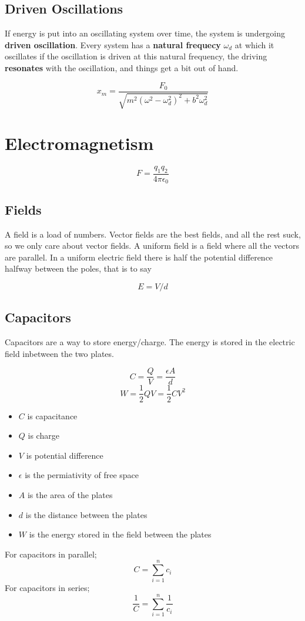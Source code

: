 \documentclass{article}
\begin{document}
\subsection{Driven Oscillations}
If energy is put into an oscillating system over time, the system is undergoing \textbf{driven oscillation}. Every system has a \textbf{natural frequecy} $\omega_d$ at which it oscillates if the oscillation is driven at this natural frequency, the driving \textbf{resonates} with the oscillation, and things get a bit out of hand.

\[x_m=\frac{F_0}{\sqrt{m^2\left(\omega^2-\omega_d^2\right)^2+b^2\omega_d^2}}\]

\section{Electromagnetism}

\[F=\frac{q_1q_2}{4\pi\epsilon_0}\]

\subsection{Fields}

A field is a load of numbers. Vector fields are the best fields, and all the rest suck, so we only care about vector fields. A uniform field is a field where all the vectors are parallel. In a uniform electric field there is half the potential difference halfway between the poles, that is to say

\[E=V/d\]

\subsection{Capacitors}


Capacitors are a way to store energy/charge. The energy is stored in the electric field inbetween the two plates.

\[C=\frac{Q}{V}=\frac{\epsilon A}{d}\]
\[W=\frac{1}{2}QV=\frac{1}{2}CV^2\]

\begin{itemize}
	\item $C$ is capacitance
	\item $Q$ is charge
	\item $V$ is potential difference
	\item $\epsilon$ is the permiativity of free space
	\item $A$ is the area of the plates
	\item $d$ is the distance between the plates
	\item $W$ is the energy stored in the field between the plates
\end{itemize}

\noindent For capacitors in parallel;
\[C=\sum_{i=1}^nc_i\]
\noindent For capacitors in series;
\[\frac{1}{C}=\sum_{i=1}^n\frac{1}{c_i}\]
\end{document}
